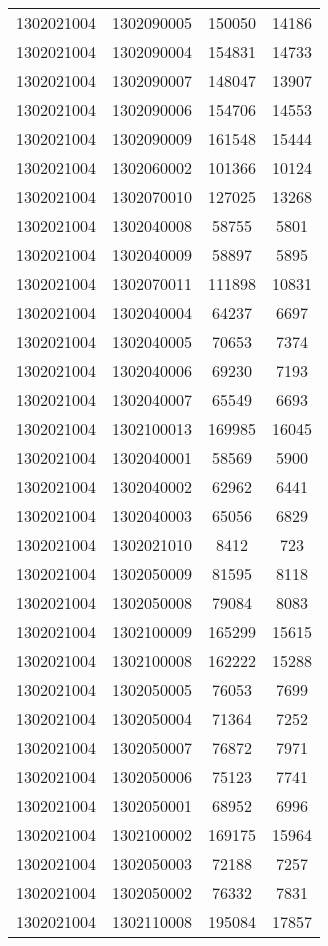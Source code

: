 \begin{longtable}[h]{llcc}
		1302021004 & 1302090005 & 150050 & 14186\\
		1302021004 & 1302090004 & 154831 & 14733\\
		1302021004 & 1302090007 & 148047 & 13907\\
		1302021004 & 1302090006 & 154706 & 14553\\
		1302021004 & 1302090009 & 161548 & 15444\\
		1302021004 & 1302060002 & 101366 & 10124\\
		1302021004 & 1302070010 & 127025 & 13268\\
		1302021004 & 1302040008 & 58755 & 5801\\
		1302021004 & 1302040009 & 58897 & 5895\\
		1302021004 & 1302070011 & 111898 & 10831\\
		1302021004 & 1302040004 & 64237 & 6697\\
		1302021004 & 1302040005 & 70653 & 7374\\
		1302021004 & 1302040006 & 69230 & 7193\\
		1302021004 & 1302040007 & 65549 & 6693\\
		1302021004 & 1302100013 & 169985 & 16045\\
		1302021004 & 1302040001 & 58569 & 5900\\
		1302021004 & 1302040002 & 62962 & 6441\\
		1302021004 & 1302040003 & 65056 & 6829\\
		1302021004 & 1302021010 & 8412 & 723\\
		1302021004 & 1302050009 & 81595 & 8118\\
		1302021004 & 1302050008 & 79084 & 8083\\
		1302021004 & 1302100009 & 165299 & 15615\\
		1302021004 & 1302100008 & 162222 & 15288\\
		1302021004 & 1302050005 & 76053 & 7699\\
		1302021004 & 1302050004 & 71364 & 7252\\
		1302021004 & 1302050007 & 76872 & 7971\\
		1302021004 & 1302050006 & 75123 & 7741\\
		1302021004 & 1302050001 & 68952 & 6996\\
		1302021004 & 1302100002 & 169175 & 15964\\
		1302021004 & 1302050003 & 72188 & 7257\\
		1302021004 & 1302050002 & 76332 & 7831\\
		1302021004 & 1302110008 & 195084 & 17857\\

\end{longtable}
